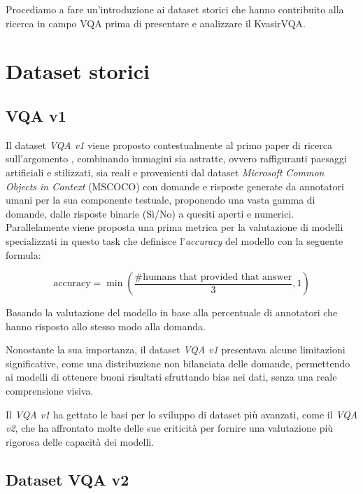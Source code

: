 \documentclass[../main.tex]{subfiles}
\begin{document}
Procediamo a fare un'introduzione ai dataset storici che hanno contribuito alla ricerca in campo VQA prima di presentare e analizzare il KvasirVQA.

\section{Dataset storici}

\subsection{VQA v1}

Il dataset \textit{VQA v1} viene proposto contestualmente al primo paper di ricerca sull'argomento \cite{DBLP:journals/corr/AntolALMBZP15}, combinando immagini sia astratte, ovvero raffiguranti paesaggi artificiali e stilizzati, sia reali e provenienti dal dataset \textit{Microsoft Common Objects in Context} (MSCOCO) \cite{lin2015microsoftcococommonobjects} con domande e risposte generate da annotatori umani per la sua componente testuale, proponendo una vasta gamma di domande, dalle risposte binarie (Sì/No) a quesiti aperti e numerici.
Parallelamente viene proposta una prima metrica per la valutazione di modelli specializzati in questo task che definisce l'\textit{accuracy} del modello con la seguente formula:

\begin{equation}
    \text{accuracy} = \min\left(\frac{\text{\#humans that provided that answer}}{3}, 1\right)
    \label{eq:accuracy}
\end{equation}

Basando la valutazione del modello in base alla percentuale di annotatori che hanno risposto allo stesso modo alla domanda.

Nonostante la sua importanza, il dataset \textit{VQA v1} presentava alcune limitazioni significative, come una distribuzione non bilanciata delle domande, permettendo ai modelli di ottenere buoni risultati sfruttando bias nei dati, senza una reale comprensione visiva.

Il \textit{VQA v1} ha gettato le basi per lo sviluppo di dataset più avanzati, come il \textit{VQA v2}, che ha affrontato molte delle sue criticità per fornire una valutazione più rigorosa delle capacità dei modelli.

\subsection{Dataset VQA v2}
\end{document}

